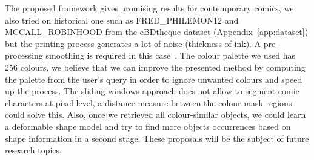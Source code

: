 % 





The proposed framework gives promising results for contemporary comics, we also tried on historical one such as FRED\_PHILEMON12 and MCCALL\_ROBINHOOD from the eBDtheque dataset (Appendix~\ref{app:dataset}) but the printing process generates a lot of noise (thickness of ink). 
A pre-processing smoothing is required in this case~\cite{l0smoothing2011,Kopf2012DigitalReconstruction}.
The colour palette we used has 256 colours, we believe that we can improve the presented method by computing the palette from the user's query in order to ignore unwanted colours and speed up the process.
The sliding windows approach does not allow to segment comic characters at pixel level, a distance measure between the colour mask regions could solve this.
Also, once we retrieved all colour-similar objects, we could learn a deformable shape model and try to find more objects occurrences based on shape information in a second stage.
These proposals will be the subject of future research topics.

